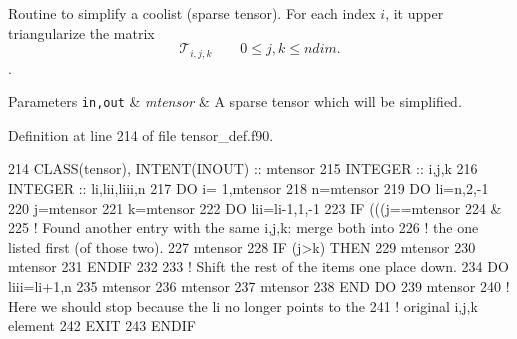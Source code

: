 Routine to simplify a coolist (sparse tensor). For each index $i$, it upper triangularize the matrix \[\mathcal{T}_{i,j,k} \qquad 0 \leq j,k \leq ndim.\]. 


\begin{DoxyParams}[1]{Parameters}
\mbox{\tt in,out}  & {\em mtensor} & A sparse tensor which will be simplified. \\
\hline
\end{DoxyParams}


Definition at line 214 of file tensor\+\_\+def.\+f90.


\begin{DoxyCode}
214     \textcolor{keywordtype}{CLASS}(tensor), \textcolor{keywordtype}{INTENT(INOUT)} :: mtensor
215     \textcolor{keywordtype}{INTEGER} :: i,j,k
216     \textcolor{keywordtype}{INTEGER} :: li,lii,liii,n
217     \textcolor{keywordflow}{DO} i= 1,mtensor%
218       n=mtensor%
219       \textcolor{keywordflow}{DO} li=n,2,-1
220         j=mtensor%
221         k=mtensor%
222         \textcolor{keywordflow}{DO} lii=li-1,1,-1
223           \textcolor{keywordflow}{IF} (((j==mtensor%
224             &%
225             \textcolor{comment}{! Found another entry with the same i,j,k: merge both into}
226             \textcolor{comment}{! the one listed first (of those two).}
227             mtensor%
228             \textcolor{keywordflow}{IF} (j>k) \textcolor{keywordflow}{THEN}
229               mtensor%
230               mtensor%
231 \textcolor{keywordflow}{            ENDIF}
232 
233             \textcolor{comment}{! Shift the rest of the items one place down.}
234             \textcolor{keywordflow}{DO} liii=li+1,n
235               mtensor%
236               mtensor%
237               mtensor%
238 \textcolor{keywordflow}{            END DO}
239             mtensor%
240             \textcolor{comment}{! Here we should stop because the li no longer points to the}
241             \textcolor{comment}{! original i,j,k element}
242             \textcolor{keywordflow}{EXIT}
243 \textcolor{keywordflow}{          ENDIF}

\end{DoxyCode}
